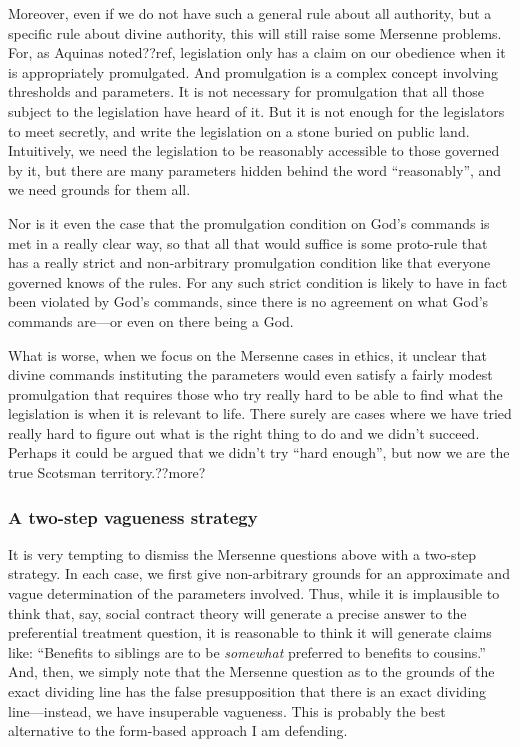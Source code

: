 Moreover, even if we do not have such a general rule about all authority, but a specific rule about divine authority, this
will still raise some Mersenne problems. For, as Aquinas noted??ref, legislation only has a claim on our obedience when it 
is appropriately promulgated. And promulgation is a complex concept involving thresholds and parameters. It is not necessary
for promulgation that all those subject to the legislation have heard of it. But it is not enough for the legislators to
meet secretly, and write the legislation on a stone  buried on public land. Intuitively, we need the legislation to be 
reasonably accessible to those governed by it, but there are many parameters hidden behind the word ``reasonably'', and 
we need grounds for them all.

Nor is it even the case that the promulgation condition on God's commands is met in a really clear way, so that all that
would suffice is some proto-rule that has a really strict and non-arbitrary promulgation condition like that everyone 
governed knows of the rules. For any such strict condition is likely to have in fact been violated by God's commands, since
there is no agreement on what God's commands are---or even on there being a God.

What is worse, when we focus on the Mersenne cases in ethics, it unclear that divine commands instituting the parameters
would even satisfy a fairly modest promulgation that requires those who try really hard to be able to find what the legislation 
is when it is relevant to life. There surely are cases where we have tried really hard to figure out what is the right thing
to do and we didn't succeed. Perhaps it could be argued that we didn't try ``hard enough'', but now we are the true
Scotsman territory.??more?

\subsubsection{A two-step vagueness strategy}
It is very tempting to dismiss the Mersenne questions above with a two-step strategy. In each case, we first give non-arbitrary grounds for 
an approximate and vague determination of the parameters involved. Thus, while it is implausible to think that, say, social contract theory
will generate a precise answer to the preferential treatment question, it is reasonable to think it will generate claims like: ``Benefits to 
siblings are to be \textit{somewhat} preferred to benefits to cousins.'' And, then, we simply note that the Mersenne question as to the grounds
of the exact dividing line has the false presupposition that there is an exact dividing line---instead, we have insuperable vagueness.
This is probably the best alternative to the form-based approach I am defending.

